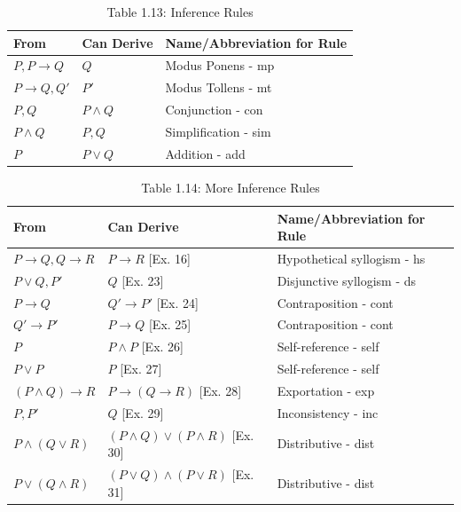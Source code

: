 \documentclass[12pt]{article}
\begin{document}
\begin{table}[h]
    \centering
    \caption*{Table 1.13: Inference Rules}
    \begin{tabular}{l l l}
        \toprule
        From & Can Derive & Name/Abbreviation for Rule \\
        \midrule
        \(P, P \rightarrow Q\) & \(Q\) & Modus Ponens - mp \\
        \(P \rightarrow Q, Q'\) & \(P'\) & Modus Tollens - mt \\
        \(P, Q\) & \(P \land Q\) & Conjunction - con \\
        \(P \land Q\) & \(P, Q\) & Simplification - sim \\
        \(P\) & \(P \lor Q\) & Addition - add \\
        \bottomrule
    \end{tabular}
\end{table}

\begin{table}[h]
    \centering
    \caption*{Table 1.14: More Inference Rules}
    \begin{tabular}{l l l}
        \toprule
        From & Can Derive & Name/Abbreviation for Rule \\
        \midrule
        \(P \rightarrow Q, Q \rightarrow R\) & \(P \rightarrow R\) [Ex. 16] & Hypothetical syllogism - hs \\
        \(P \lor Q, P'\) & \(Q\) [Ex. 23] & Disjunctive syllogism - ds \\
        \(P \rightarrow Q\) & \(Q' \rightarrow P'\) [Ex. 24] & Contraposition - cont \\
        \(Q' \rightarrow P'\) & \(P \rightarrow Q\) [Ex. 25] & Contraposition - cont \\
        \(P\) & \(P \land P\) [Ex. 26] & Self-reference - self \\
        \(P \lor P\) & \(P\) [Ex. 27] & Self-reference - self \\
        \((P \land Q) \rightarrow R\) & \(P \rightarrow (Q \rightarrow R)\) [Ex. 28] & Exportation - exp \\
        \(P, P'\) & \(Q\) [Ex. 29] & Inconsistency - inc \\
        \(P \land (Q \lor R)\) & \((P \land Q) \lor (P \land R)\) [Ex. 30] & Distributive - dist \\
        \(P \lor (Q \land R)\) & \((P \lor Q) \land (P \lor R)\) [Ex. 31] & Distributive - dist \\
        \bottomrule
    \end{tabular}
\end{table}
\end{document}
